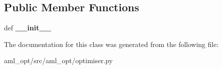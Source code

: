 \subsection*{Public Member Functions}
\begin{DoxyCompactItemize}
\item 
\hypertarget{classaml__opt_1_1optimiser_1_1_optimiser_a8a3e5a4d5f0a18d5404e34c2dac7dfb5}{def {\bfseries \-\_\-\-\_\-init\-\_\-\-\_\-}}\label{classaml__opt_1_1optimiser_1_1_optimiser_a8a3e5a4d5f0a18d5404e34c2dac7dfb5}

\end{DoxyCompactItemize}


The documentation for this class was generated from the following file\-:\begin{DoxyCompactItemize}
\item 
aml\-\_\-opt/src/aml\-\_\-opt/optimiser.\-py\end{DoxyCompactItemize}
